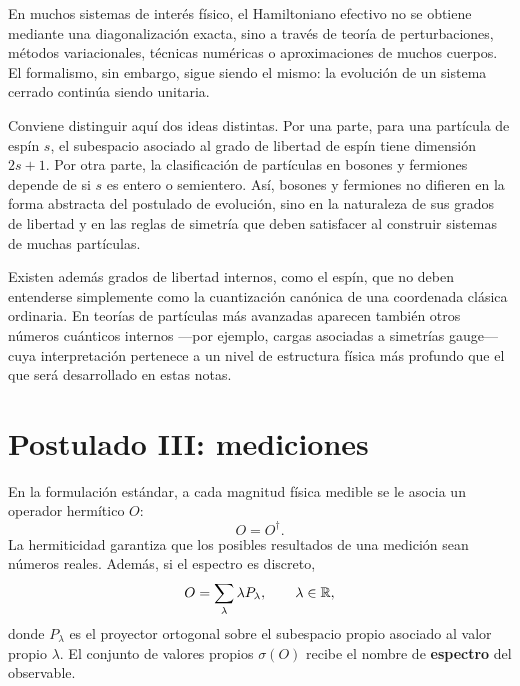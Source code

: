 \documentclass[../main.tex]{subfiles}
\begin{document}
\begin{observacion}
En muchos sistemas de interés físico, el Hamiltoniano efectivo no se obtiene mediante una diagonalización exacta, sino a través de teoría de perturbaciones, métodos variacionales, técnicas numéricas o aproximaciones de muchos cuerpos. El formalismo, sin embargo, sigue siendo el mismo: la evolución de un sistema cerrado continúa siendo unitaria.
\end{observacion}

\begin{observacion}
Conviene distinguir aquí dos ideas distintas. Por una parte, para una partícula de espín $s$, el subespacio asociado al grado de libertad de espín tiene dimensión $2s+1$. Por otra parte, la clasificación de partículas en bosones y fermiones depende de si $s$ es entero o semientero. Así, bosones y fermiones no difieren en la forma abstracta del postulado de evolución, sino en la naturaleza de sus grados de libertad y en las reglas de simetría que deben satisfacer al construir sistemas de muchas partículas.
\end{observacion}

\begin{observacion}
Existen además grados de libertad internos, como el espín, que no deben entenderse simplemente como la cuantización canónica de una coordenada clásica ordinaria. En teorías de partículas más avanzadas aparecen también otros números cuánticos internos ---por ejemplo, cargas asociadas a simetrías gauge--- cuya interpretación pertenece a un nivel de estructura física más profundo que el que será desarrollado en estas notas.
\end{observacion}

\section{Postulado III: mediciones}


En la formulación estándar, a cada magnitud física medible se le asocia un operador hermítico $O$:
\begin{equation*}
    O=O^\dagger.
\end{equation*}
La hermiticidad garantiza que los posibles resultados de una medición sean números reales. Además, si el espectro es discreto,
\begin{equation*}
    O=\sum_{\lambda}\lambda P_\lambda,
    \qquad \lambda\in\mathbb{R},
\end{equation*}
donde $P_\lambda$ es el proyector ortogonal sobre el subespacio propio asociado al valor propio $\lambda$. El conjunto de valores propios $\sigma(O)$ recibe el nombre de \textbf{espectro} del observable.
\end{document}
